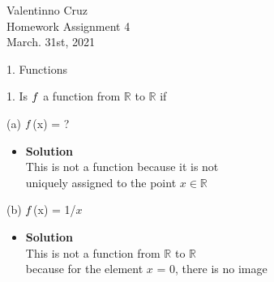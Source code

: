 \documentclass[11pt]{article}
\begin{document}
\begin{center}
    {\Large Valentinno Cruz\\
    Homework Assignment 4\\
    March. 31st, 2021\\}

\end{center}



\begin{flushleft}
{\Large 1. Functions}
\end{flushleft}




\begin{enumerate}

\begin{flushleft}
{\large 1. Is $\mathnormal{f}$ a function from $\mathbb{ R}$ 
to $\mathbb{ R}$ if}\\
\end{flushleft}





\large (a) $\mathnormal{f}$(x) = \textpm {}?\\

\begin{itemize}
\item \textbf{Solution}\\
\large This is not a function because it is not \\
\large uniquely assigned to the point $x \in  \mathbb{ R}$ \\

\end {itemize}
\end {enumerate}


\begin{enumerate}

\begin{flushleft}
\end{flushleft}

\large (b) $\mathnormal{f}$(x) = 1/$x$\\

\begin{itemize}
\item \textbf{Solution}\\
\large This is not a function from $\mathbb{ R}$ to $\mathbb{ R}$ \\
\large because for the element $x$ = 0, there is no image \\

\end {itemize}
\end {enumerate}
\end{document}
